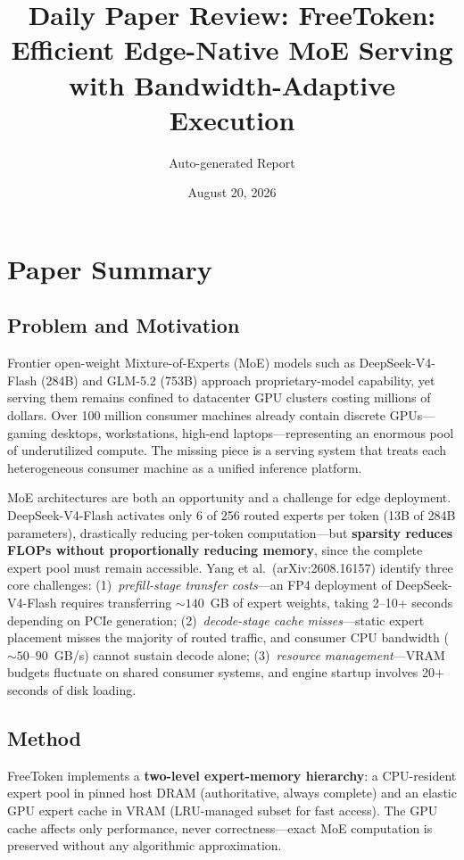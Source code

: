 \documentclass[11pt,a4paper]{article}
\title{Daily Paper Review: FreeToken: Efficient Edge-Native MoE Serving with Bandwidth-Adaptive Execution}
\author{Auto-generated Report}
\date{August 20, 2026}
\begin{document}
\maketitle

\section{Paper Summary}

\subsection{Problem and Motivation}
Frontier open-weight Mixture-of-Experts (MoE) models such as DeepSeek-V4-Flash (284B) and GLM-5.2 (753B) approach proprietary-model capability, yet serving them remains confined to datacenter GPU clusters costing millions of dollars. Over 100 million consumer machines already contain discrete GPUs---gaming desktops, workstations, high-end laptops---representing an enormous pool of underutilized compute. The missing piece is a serving system that treats each heterogeneous consumer machine as a unified inference platform.

MoE architectures are both an opportunity and a challenge for edge deployment. DeepSeek-V4-Flash activates only 6 of 256 routed experts per token (13B of 284B parameters), drastically reducing per-token computation---but \textbf{sparsity reduces FLOPs without proportionally reducing memory}, since the complete expert pool must remain accessible. Yang et al.\ (arXiv:2608.16157) identify three core challenges: (1)~\emph{prefill-stage transfer costs}---an FP4 deployment of DeepSeek-V4-Flash requires transferring ${\sim}140$~GB of expert weights, taking 2--10+ seconds depending on PCIe generation; (2)~\emph{decode-stage cache misses}---static expert placement misses the majority of routed traffic, and consumer CPU bandwidth (${\sim}50$--$90$~GB/s) cannot sustain decode alone; (3)~\emph{resource management}---VRAM budgets fluctuate on shared consumer systems, and engine startup involves 20+ seconds of disk loading.

\subsection{Method}
FreeToken implements a \textbf{two-level expert-memory hierarchy}: a CPU-resident expert pool in pinned host DRAM (authoritative, always complete) and an elastic GPU expert cache in VRAM (LRU-managed subset for fast access). The GPU cache affects only performance, never correctness---exact MoE computation is preserved without any algorithmic approximation.
\end{document}
